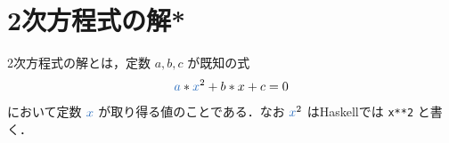 \documentclass[a5paper,twoside,fleqn,draft]{jsbook}
\def\varColor{NavyBlue}
\newcommand{\programminglanguage}[1]{\textsf{#1}}
\newcommand{\haskell}{\programminglanguage{Haskell}}
\newcommand{\code}[1]{\texttt{#1}}
\newcommand{\mVar}[1]{\textcolor{\varColor}{#1}}
\newcommand{\mAVar}{{\mVar{a}}}
\newcommand{\mXVar}{\mVar{x}}
\begin{document}

\section{2次方程式の解*}

2次方程式の解とは，定数 $a,b,c$ が既知の式
\begin{equation}
\mAVar*\mXVar^2+b*x+c=0
\end{equation}
において定数 $\mXVar$ が取り得る値のことである．なお $\mXVar^2$ は\haskell では
\code{x**2} と書く．
\end{document}
